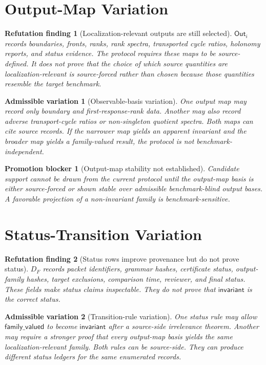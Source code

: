 \documentclass[11pt]{article}
\newcommand{\Out}{\mathsf{Out}}
\newtheorem{finding}{Refutation finding}
\newtheorem{variation}{Admissible variation}
\newtheorem{blocker}{Promotion blocker}
\begin{document}
\section{Output-Map Variation}

\begin{finding}[Localization-relevant outputs are still selected]
\(\Out_i\) records boundaries, fronts, ranks, rank spectra, transported
cycle ratios, holonomy reports, and status evidence. The protocol requires
these maps to be source-defined. It does not prove that the choice of which
source quantities are localization-relevant is source-forced rather than
chosen because those quantities resemble the target benchmark.
\end{finding}

\begin{variation}[Observable-basis variation]
One output map may record only boundary and first-response-rank data. Another
may also record adverse transport-cycle ratios or non-singleton quotient
spectra. Both maps can cite source records. If the narrower map yields an
apparent invariant and the broader map yields a family-valued result, the
protocol is not benchmark-independent.
\end{variation}

\begin{blocker}[Output-map stability not established]
Candidate support cannot be drawn from the current protocol until the
output-map basis is either source-forced or shown stable over admissible
benchmark-blind output bases. A favorable projection of a non-invariant
family is benchmark-sensitive.
\end{blocker}

\section{Status-Transition Variation}

\begin{finding}[Status rows improve provenance but do not prove status]
\(D_F\) records packet identifiers, grammar hashes, certificate status,
output-family hashes, target exclusions, comparison time, reviewer, and final
status. These fields make status claims inspectable. They do not prove that
\(\mathsf{invariant}\) is the correct status.
\end{finding}

\begin{variation}[Transition-rule variation]
One status rule may allow \(\mathsf{family\_valued}\) to become
\(\mathsf{invariant}\) after a source-side irrelevance theorem. Another may
require a stronger proof that every output-map basis yields the same
localization-relevant family. Both rules can be source-side. They can produce
different status ledgers for the same enumerated records.
\end{variation}
\end{document}
